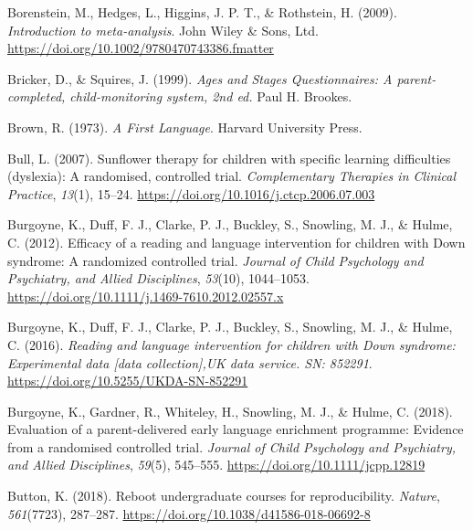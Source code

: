\documentclass{krantz}
\newlength{\cslhangindent}
\newlength{\cslentryspacingunit} %
\newenvironment{CSLReferences}[2] %
{%
\setlength{\parindent}{0pt}
\ifodd #1
\let\oldpar\par
\def\par{\hangindent=\cslhangindent\oldpar}
\fi
\setlength{\parskip}{#2\cslentryspacingunit}
}%
{}
\begin{document}
\begin{CSLReferences}{1}{0}
\leavevmode{}%
Borenstein, M., Hedges, L., Higgins, J. P. T., \& Rothstein, H. (2009). \emph{Introduction to meta-analysis}. {John Wiley \& Sons, Ltd}. \url{https://doi.org/10.1002/9780470743386.fmatter}

\leavevmode{}%
Bricker, D., \& Squires, J. (1999). \emph{Ages and {Stages Questionnaires}: {A} parent-completed, child-monitoring system, 2nd ed.} {Paul H. Brookes}.

\leavevmode{}%
Brown, R. (1973). \emph{A {First Language}}. {Harvard University Press}.

\leavevmode{}%
Bull, L. (2007). Sunflower therapy for children with specific learning difficulties (dyslexia): A randomised, controlled trial. \emph{Complementary Therapies in Clinical Practice}, \emph{13}(1), 15--24. \url{https://doi.org/10.1016/j.ctcp.2006.07.003}

\leavevmode{}%
Burgoyne, K., Duff, F. J., Clarke, P. J., Buckley, S., Snowling, M. J., \& Hulme, C. (2012). Efficacy of a reading and language intervention for children with {Down} syndrome: A randomized controlled trial. \emph{Journal of Child Psychology and Psychiatry, and Allied Disciplines}, \emph{53}(10), 1044--1053. \url{https://doi.org/10.1111/j.1469-7610.2012.02557.x}

\leavevmode{}%
Burgoyne, K., Duff, F. J., Clarke, P. J., Buckley, S., Snowling, M. J., \& Hulme, C. (2016). \emph{Reading and language intervention for children with {Down} syndrome: {Experimental} data {[}data collection{]},UK data service. SN: 852291}. \url{https://doi.org/10.5255/UKDA-SN-852291}

\leavevmode{}%
Burgoyne, K., Gardner, R., Whiteley, H., Snowling, M. J., \& Hulme, C. (2018). Evaluation of a parent-delivered early language enrichment programme: Evidence from a randomised controlled trial. \emph{Journal of Child Psychology and Psychiatry, and Allied Disciplines}, \emph{59}(5), 545--555. \url{https://doi.org/10.1111/jcpp.12819}

\leavevmode{}%
Button, K. (2018). Reboot undergraduate courses for reproducibility. \emph{Nature}, \emph{561}(7723), 287--287. \url{https://doi.org/10.1038/d41586-018-06692-8}


\end{CSLReferences}
\end{document}
